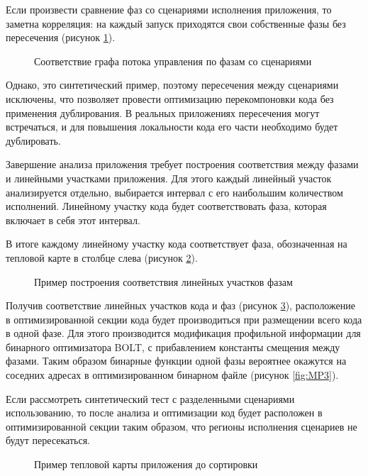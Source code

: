 Если произвести сравнение фаз со сценариями исполнения приложения, то заметна корреляция: на каждый запуск приходятся свои собственные фазы без пересечения (рисунок \cref{fig:Phase2}).
 
\begin{figure}[!h]
    \centerfloat{
        \texttt{[image: \_13]}
    }
    \caption{Соответствие графа потока управления по фазам со сценариями}\label{fig:Phase2}
\end{figure}
Однако, это синтетический пример, поэтому пересечения между сценариями исключены, что позволяет провести оптимизацию перекомпоновки кода без применения дублирования. В реальных приложениях пересечения могут встречаться, и для повышения локальности кода его части необходимо будет дублировать.

Завершение анализа приложения требует построения соответствия между фазами и линейными участками приложения. Для этого каждый линейный участок анализируется отдельно, выбирается интервал с его наибольшим количеством исполнений. Линейному участку кода будет соответствовать фаза, которая включает в себя этот интервал.

В итоге каждому линейному участку кода соответствует фаза, обозначенная на тепловой карте в столбце слева (рисунок \cref{fig:MP1}).
 
\begin{figure}[!h]
    \centerfloat{
        \texttt{[image: \_14]}
    }
    \caption{Пример построения соответствия линейных участков фазам}\label{fig:MP1}
\end{figure}

Получив соответствие линейных участков кода и фаз (рисунок \cref{fig:MP2}), расположение в оптимизированной секции кода будет производиться при размещении всего кода в одной фазе. Для этого производится модификация профильной информации для бинарного оптимизатора BOLT, с прибавлением константы смещения между фазами. Таким образом бинарные функции одной фазы вероятнее окажутся на соседних адресах в оптимизированном бинарном файле (рисунок \cref{fig:MP3}).

Если рассмотреть синтетический тест с разделенными сценариями использованию, то после анализа и оптимизации код будет расположен в оптимизированной секции таким образом, что регионы исполнения сценариев не будут пересекаться.

\begin{figure}[!h]
    \centerfloat{
        \texttt{[image: \_15а]}
    }
    \caption{Пример тепловой карты приложения до сортировки}\label{fig:MP2}
\end{figure}

